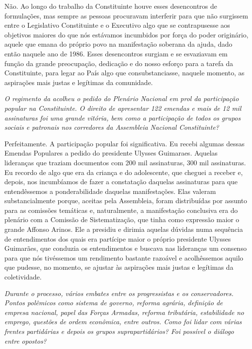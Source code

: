 Não. Ao longo do trabalho da Constituinte houve
esses desencontros de formulações, mas sempre as pessoas procuravam
interferir para que não surgissem entre o Legislativo Constituinte e o
Executivo algo que se contrapusesse aos objetivos maiores do que nós
estávamos incumbidos por força do poder originário, aquele que emana do
próprio povo na manifestação soberana da ajuda, dado então naquele ano
de 1986. Esses desencontros surgiam e se esvaziavam em função da grande
preocupação, dedicação e do nosso esforço para a tarefa da Constituinte,
para legar ao País algo que consubstanciasse, naquele momento, as
aspirações mais justas e legítimas da comunidade.

\medskip

\emph{O regimento da  acolheu o pedido do Plenário Nacional em prol
da participação popular na Constituinte. O direito de apresentar 122
emendas e mais de 12 mil assinaturas foi uma grande vitória, bem como a
participação de todos os grupos sociais e patronais nos corredores da
Assembleia Nacional Constituinte?}

Perfeitamente. A participação popular foi
significativa. Eu recebi algumas dessas Emendas Populares a pedido do
presidente Ulysses Guimaraes. Aquelas lideranças que traziam documentos
com 200 mil assinaturas, 300 mil assinaturas. Eu recordo de algo que era
da criança e do adolescente, que cheguei a receber e, depois, nos
incumbíamos de fazer a constatação daquelas assinaturas para que
entendêssemos a ponderabilidade daquelas manifestações. Elas valeram
substancialmente porque, aceitas pela Assembleia, foram distribuídas por
assunto para as comissões temáticas e, naturalmente, a manifestação
conclusiva era do plenário com a Comissão de Sistematização, que tinha
como expressão maior o grande Affonso Arinos. Ele a presidiu e dirimia
aquelas dúvidas numa sequência de entendimentos dos quais era partícipe
maior o próprio presidente Ulysses Guimarães, que conduzia os
entendimentos e buscava nas lideranças um consenso para que nós
tivéssemos um rendimento bastante razoável e acolhêssemos aquilo que
pudesse, no momento, se ajustar às aspirações mais justas e legítimas da
coletividade.

\medskip

\emph{Durante o processo, vários embates entre os progressistas e os
conservadores. Pontos polêmicos como sistema de governo, reforma
agrária, definição de empresa nacional, papel das Forças Armadas,
reforma tributária, estabilidade no emprego, questões de ordem
econômica, entre outros. Como foi lidar com várias frentes partidárias e
depois os grupos suprapartidários? Foi possível o diálogo entre
opostos?}

